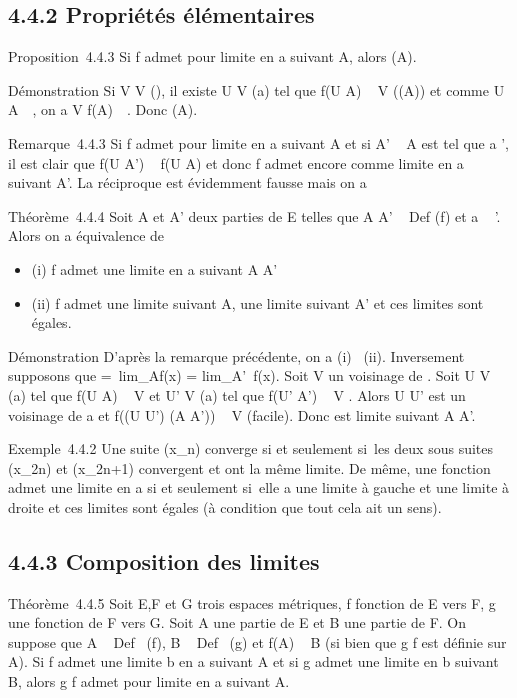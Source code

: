 \documentclass[]{article}
\begin{document}
\subsection{4.4.2 Propriétés élémentaires}

Proposition~4.4.3 Si f admet \ell pour limite en a suivant A, alors \ell
\in\overlinef(A).

Démonstration Si V \in V (\ell), il existe U \in V (a) tel que f(U \bigcap A) \subset~ V
(\bigcapf(A)) et comme U \bigcap A\neq~\varnothing~, on a V \bigcap
f(A)\neq~\varnothing~. Donc \ell
\in\overlinef(A).

Remarque~4.4.3 Si f admet \ell pour limite en a suivant A et si A' \subset~ A est
tel que a \in\overlineA', il est clair que f(U \bigcap A') \subset~
f(U \bigcap A) et donc f admet encore \ell comme limite en a suivant A'. La
réciproque est évidemment fausse mais on a

Théorème~4.4.4 Soit A et A' deux parties de E telles que A \cup A'
\subset~ Def (f) et a \in\overlineA~
\bigcap\overlineA'. Alors on a équivalence de

\begin{itemize}
\itemsep1pt\parskip0pt
\item
  (i) f admet une limite en a suivant A \cup A'
\item
  (ii) f admet une limite suivant A, une limite suivant A' et ces
  limites sont égales.
\end{itemize}

Démonstration D'après la remarque précédente, on a (i) \rigtharrow~(ii).
Inversement supposons que \ell =\
lim_Af(x) = lim_A'~f(x). Soit
V un voisinage de \ell. Soit U \in V (a) tel que f(U \bigcap A) \subset~ V et U' \in V (a)
tel que f(U' \bigcap A') \subset~ V . Alors U \bigcap U' est un voisinage de a et f((U \bigcap
U') \bigcap (A \cup A')) \subset~ V (facile). Donc \ell est limite suivant A \cup A'.

Exemple~4.4.2 Une suite (x_n) converge si et seulement si~les
deux sous suites (x_2n) et (x_2n+1) convergent et ont
la même limite. De même, une fonction admet une limite en a si et
seulement si~elle a une limite à gauche et une limite à droite et ces
limites sont égales (à condition que tout cela ait un sens).

\subsection{4.4.3 Composition des limites}

Théorème~4.4.5 Soit E,F et G trois espaces métriques, f fonction de E
vers F, g une fonction de F vers G. Soit A une partie de E et B une
partie de F. On suppose que A \subset~ Def~ (f), B
\subset~ Def~ (g) et f(A) \subset~ B (si bien que g \cdot f est
définie sur A). Si f admet une limite b en a suivant A et si g admet une
limite \ell en b suivant B, alors g \cdot f admet \ell pour limite en a suivant A.
\end{document}
